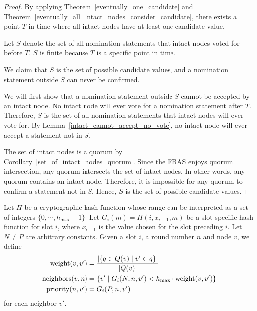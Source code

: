 \begin{proof}
    By applying Theorem~\ref{eventually_one_candidate} and Theorem~\ref{eventually_all_intact_nodes_consider_candidate},
    there exists a point $T$ in time where all intact nodes have at least one candidate value.

    Let $S$ denote the set of all nomination statements that intact nodes voted for before $T$.
    $S$ is finite because $T$ is a specific point in time.

    We claim that $S$ is the set of possible candidate values, and a nomination statement outside $S$ can never be confirmed.

    We will first show that a nomination statement outside $S$ cannot be accepted by an intact node.
    No intact node will ever vote for a nomination statement after $T$.
    Therefore, $S$ is the set of all nomination statements that intact nodes will ever vote for.
    By Lemma~\ref{intact_cannot_accept_no_vote}, no intact node will ever accept a statement not in $S$.

    The set of intact nodes is a quorum by Corollary~\ref{set_of_intact_nodes_quorum}.
    Since the FBAS enjoys quorum intersection, any quorum intersects the set of intact nodes.
    In other words, any quorum contains an intact node.
    Therefore, it is impossible for any quorum to confirm a statement not in $S$.
    Hence, $S$ is the set of possible candidate values.
\end{proof}




\begin{defn}
    Let $H$ be a cryptographic hash function whose range can be interpreted as a set of integers $\{ 0, \cdots, h_{\max} - 1 \}$.
    Let $G_i(m) = H(i, x_{i - 1}, m)$ be a slot-specific hash function for slot $i$, where $x_{i - 1}$ is the value chosen for the slot preceding $i$.
    Let $N \ne P$ are arbitrary constants.
    Given a slot $i$, a round number $n$ and node $v$, we define
    \begin{align*}
        \operatorname{weight}(v, v') &= \frac{\abs{\{ q \in Q(v) \mid v' \in q \}}}{\abs{Q(v)}} \\
        \operatorname{neighbors}(v, n) &= \{ v' \mid G_i(N, n, v') < h_{\max} \cdot \operatorname{weight}(v, v') \} \\
        \operatorname{priority}(n, v') &= G_i(P, n, v')
    \end{align*}
    for each neighbor $v'$.
\end{defn}

